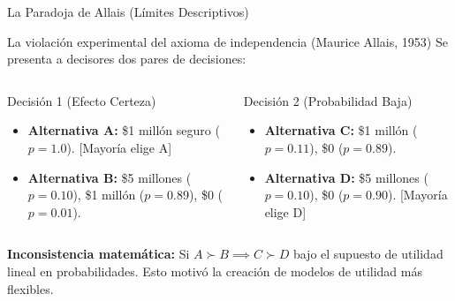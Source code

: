 \documentclass[aspectratio=169, 10pt]{beamer}
\begin{document}
\begin{frame}{La Paradoja de Allais (Límites Descriptivos)}
    \begin{alertblock}{La violación experimental del axioma de independencia (Maurice Allais, 1953)}
        Se presenta a decisores dos pares de decisiones:
    \end{alertblock}
    \begin{columns}[T]
        \begin{column}{0.48\textwidth}
            \begin{block}{Decisión 1 (Efecto Certeza)}
                \scriptsize
                \begin{itemize}
                    \item \textbf{Alternativa A:} \$1 millón seguro ($p=1.0$). [Mayoría elige A]
                    \item \textbf{Alternativa B:} \$5 millones ($p=0.10$), \$1 millón ($p=0.89$), \$0 ($p=0.01$).
                \end{itemize}
            \end{block}
        \end{column}
        
        \begin{column}{0.48\textwidth}
            \begin{block}{Decisión 2 (Probabilidad Baja)}
                \scriptsize
                \begin{itemize}
                    \item \textbf{Alternativa C:} \$1 millón ($p=0.11$), \$0 ($p=0.89$).
                    \item \textbf{Alternativa D:} \$5 millones ($p=0.10$), \$0 ($p=0.90$). [Mayoría elige D]
                \end{itemize}
            \end{block}
        \end{column}
    \end{columns}
    \vskip 5pt
    \centering \footnotesize \textbf{Inconsistencia matemática:} Si $A \succ B \implies C \succ D$ bajo el supuesto de utilidad lineal en probabilidades. Esto motivó la creación de modelos de utilidad más flexibles.
\end{frame}
\end{document}
